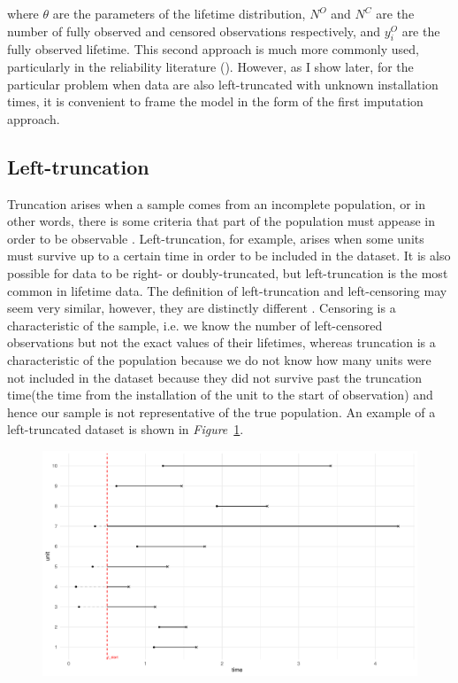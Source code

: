 \noindent where $\theta$ are the parameters of the lifetime distribution, $N^O$ and $N^C$ are the number of fully observed and censored observations respectively, and $y^O_i$ are the fully observed lifetime. This second approach is much more commonly used, particularly in the reliability literature (). However, as I show later, for the particular problem when data are also left-truncated with unknown installation times, it is convenient to frame the model in the form of the first imputation approach.

\subsection{Left-truncation}

Truncation arises when a sample comes from an incomplete population, or in other words, there is some criteria that part of the population must appease in order to be observable \citep{guo1993}. Left-truncation, for example, arises when some units must survive up to a certain time in order to be included in the dataset. It is also possible for data to be right- or doubly-truncated, but left-truncation is the most common in lifetime data. The definition of left-truncation and left-censoring may seem very similar, however, they are distinctly different \citep{mitra2013}. Censoring is a characteristic of the sample, i.e. we know the number of left-censored observations but not the exact values of their lifetimes, whereas truncation is a characteristic of the population because we do not know how many units were not included in the dataset because they did not survive past the truncation time(the time from the installation of the unit to the start of observation) and hence our sample is not representative of the true population. An example of a left-truncated dataset is shown in \textit{Figure}~\ref{fig:left_trunc_example}. 

\begin{figure}[h]
    \centering
    \includegraphics[width=1\textwidth]{./figures/left_truncation_example.pdf}
    \caption{}
    \label{fig:left_trunc_example}
\end{figure}

